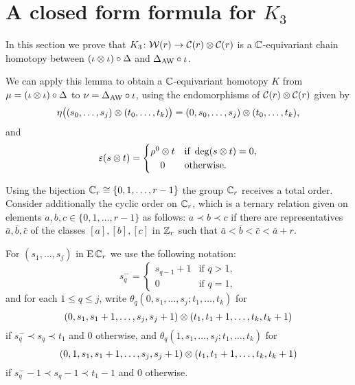 
\section{A closed form formula for $K_3$}\label{s:postponed}

In this section we prove that $K_3 \colon \mathcal{W}(r) \to \mathcal{C}(r) \otimes \mathcal{C}(r)$ is a $\mathbb{C}$-equivariant chain homotopy between $(\iota \otimes \iota) \circ \Delta$ and $\Delta_{\operatorname{AW}} \circ \iota$.

We can apply this lemma to obtain a $\mathbb{C}$-equivariant homotopy $K$ from $\mu = (\iota \otimes \iota) \circ \Delta$ to $\nu = \Delta_{\operatorname{AW}} \circ \iota$, using the endomorphisms of $\mathcal{C}(r) \otimes \mathcal{C}(r)$ given by
\[
\eta \big((s_0,\dots,s_j) \otimes (t_0,\dots,t_k)\big) = (0,s_0,\dots,s_j) \otimes (t_0,\dots,t_k),
\]
and
\[
\varepsilon(s \ot t) =
\begin{cases}
	\rho^0 \ot t & \text{if } \deg(s \ot t) = 0, \\
	\hfil0 & \text{otherwise}.
\end{cases}
\]


Using the bijection $\mathbb{C}_r\cong\{0,1,\dots,r-1\}$ the group $\mathbb{C}_r$ receives a total order.
Consider additionally the cyclic order on $\mathbb{C}_r$, which is a ternary relation given on elements $a,b,c\in \{0,1,\dots,r-1\}$ as follows: $a\prec b\prec c$
if there are representatives $\bar{a},\bar{b},\bar{c}$ of the classes $[a],[b],[c]$ in $\mathbb{Z}_r$ such that $\bar{a}<\bar{b}<\bar{c}<\bar{a}+r$.

For $(s_1,\dots,s_j)$ in $\operatorname{E}\mathbb{C}_r$ we use the following notation:
\[
s_q^- =
\begin{cases}
	s_{q-1}+1 & \text{if } q>1, \\
	0 & \text{if } q=1,
\end{cases}
\]
and for each $1\leq q\leq j$, write $\theta_q(0,s_1,\dots,s_j;t_1,\dots,t_k)$ for
\[
(0,s_1,s_1+1,\dots,s_j,s_j+1)\otimes (t_1,t_1+1,\dots,t_k,t_k+1)
\]
if $s_q^- \prec s_q \prec t_1$ and $0$ otherwise, and $\theta_q(1,s_1,\dots,s_j;t_1,\dots,t_k)$ for
\[
(0,1,s_1,s_1+1,\dots,s_j,s_j+1)\otimes (t_1,t_1+1,\dots,t_k,t_k+1)
\]
if $s_q^--1 \prec s_q-1 \prec t_1-1$ and $0$ otherwise.

